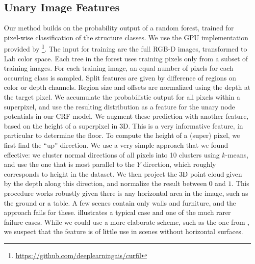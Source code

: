 \documentclass[a4paper, 10pt, conference]{ieeeconf}      %
\begin{document}
\subsection{Unary Image Features}
Our method builds on the probability output of a random forest, trained for pixel-wise
classification of the structure classes.
We use the GPU implementation provided by \citet{stueckler2013}\footnote{\url{https://github.com/deeplearningais/curfil}}.
The input for training are the full RGB-D images, transformed to Lab
color space. Each tree in the forest uses training pixels only from a subset of
training images. For each training image, an equal number of pixels for each
occurring class is sampled. Split features are given by difference of regions
on color or depth channels. Region size and offsets are normalized using the
depth at the target pixel.
We accumulate the probabilistic output for all pixels within a superpixel, and
use the resulting distribution as a feature for the unary node potentials in our CRF model.
We augment these prediction with another feature, based on the height of a superpixel in 3D.
This is a very informative feature, in particular to determine the floor.
To compute the height of a (super) pixel, we first find the ``up'' direction.
We use a very simple approach that we found effective: we cluster normal directions of all pixels
into 10 clusters using $k$-means, and use the one that is most parallel to the $Y$ direction, which
roughly corresponds to height in the dataset.
We then project the 3D point cloud given by the depth along this direction, and normalize the result between
$0$ and $1$.
This procedure works robustly given there is any horizontal area in the image,
such as the ground or a table. A few scenes contain only walls and furniture,
and the approach fails for these.  illustrates a typical case and
one of the much rarer failure cases.
While we could use a more elaborate scheme,
such as the one from \citet{SilbermanECCV12}, we suspect that the feature is of
little use in scenes without horizontal surfaces.
\end{document}
